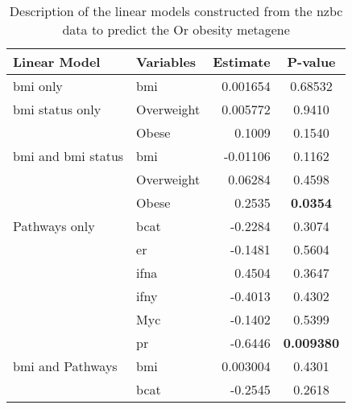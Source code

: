	\begin{table}[htpb]
		\centering
		\caption{Description of the linear models constructed from the \gls{nzbc} data to predict the Or obesity metagene}
		\label{tab:lm_sig_var_or}
		\begin{threeparttable}
			\begin{tabular}{llrc}
				Linear Model & Variables & Estimate & P-value\\
				\hline
				\hline
				\rule{0pt}{2.25ex}\gls{bmi} only                           & \gls{bmi}  & 0.001654  & 0.68532 \\
				\hline
				\rule{0pt}{2.25ex}\gls{bmi} status only                    & Overweight & 0.005772  & 0.9410  \\
                                                                           & Obese      & 0.1009    & 0.1540  \\
				\hline
				\rule{0pt}{2.25ex}\gls{bmi} and \gls{bmi} status           & \gls{bmi}  & -0.01106  & 0.1162  \\
                                                                           & Overweight & 0.06284   & 0.4598  \\
                                                                           & Obese      & 0.2535    & \bfseries 0.0354   \\
				\hline
				\rule{0pt}{2.25ex}Pathways only                            & \gls{bcat} & -0.2284   & 0.3074 \\
                                                                           & \gls{er}   & -0.1481   & 0.5604 \\
                                                                           & \gls{ifna} & 0.4504    & 0.3647 \\
                                                                           & \gls{ifny} & -0.4013   & 0.4302 \\
                                                                           & Myc        & -0.1402   & 0.5399 \\
                                                                           & \gls{pr}   & -0.6446   & \bfseries 0.009380  \\
				\hline
				\rule{0pt}{2.25ex}\gls{bmi} and Pathways                   & \gls{bmi}  & 0.003004  & 0.4301 \\
                                                                           & \gls{bcat} & -0.2545   & 0.2618 \\

\end{tabular}
\end{threeparttable}
\end{table}
